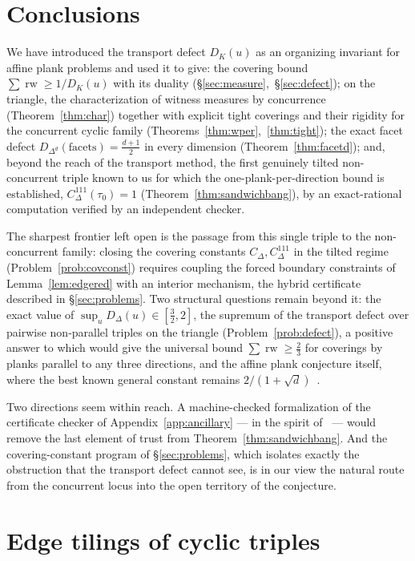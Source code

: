 \documentclass{aims}
\numberwithin{equation}{section}
\theoremstyle{plain}
\theoremstyle{definition}
\theoremstyle{remark}
\newcommand{\rw}{\operatorname{rw}}
\begin{document}
\section{Conclusions}\label{sec:conclusions}

We have introduced the transport defect $D_K(u)$ as an organizing invariant
for affine plank problems and used it to give: the covering bound
$\sum\rw\ge 1/D_K(u)$ with its duality (\S\ref{sec:measure},~\S\ref{sec:defect});
on the triangle, the characterization of witness measures by concurrence
(Theorem~\ref{thm:char}) together with explicit tight coverings and their
rigidity for the concurrent cyclic family (Theorems~\ref{thm:wper},~\ref{thm:tight});
the exact facet defect $D_{\Delta^d}(\mathrm{facets})=\tfrac{d+1}{2}$ in every
dimension (Theorem~\ref{thm:facetd}); and, beyond the reach of the transport
method, the first genuinely tilted non-concurrent triple known to us for which
the one-plank-per-direction bound is established, $C^{111}_\Delta(\tau_0)=1$
(Theorem~\ref{thm:sandwichbang}), by an exact-rational computation verified by
an independent checker.

The sharpest frontier left open is the passage from this single triple to the
non-concurrent family: closing the covering constants $C_\Delta,C^{111}_\Delta$
in the tilted regime (Problem~\ref{prob:covconst}) requires coupling the forced
boundary constraints of Lemma~\ref{lem:edgered} with an interior mechanism, the
hybrid certificate described in \S\ref{sec:problems}. Two structural questions
remain beyond it: the exact value of $\sup_u D_\Delta(u)\in[\tfrac32,2]$, the
supremum of the transport defect over pairwise non-parallel triples on the
triangle (Problem~\ref{prob:defect}), a positive answer to which would give the
universal bound $\sum\rw\ge\tfrac23$ for coverings by planks parallel to any
three directions, and the affine plank conjecture itself, where the best known
general constant remains $2/(1+\sqrt d)$~\cite{BY26}.

Two directions seem within reach. A machine-checked formalization of the
certificate checker of Appendix~\ref{app:ancillary} --- in the spirit
of~\cite{Hales17,mathlib20} --- would remove the last element of trust from
Theorem~\ref{thm:sandwichbang}. And the covering-constant program of
\S\ref{sec:problems}, which isolates exactly the obstruction that the transport
defect cannot see, is in our view the natural route from the concurrent locus
into the open territory of the conjecture.

\appendix
\section{Edge tilings of cyclic triples}\label{app:tilings}
\end{document}
